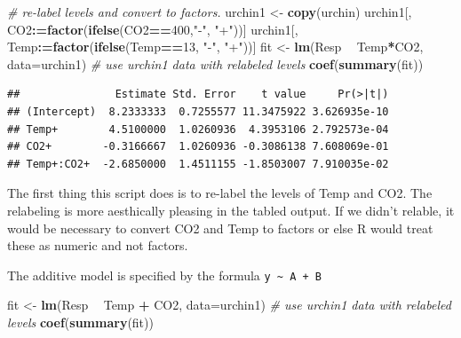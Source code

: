 \documentclass[]{book}
\newenvironment{Shaded}{\begin{snugshade}}{\end{snugshade}}
\newcommand{\KeywordTok}[1]{\textcolor[rgb]{0.13,0.29,0.53}{\textbf{#1}}}
\newcommand{\DataTypeTok}[1]{\textcolor[rgb]{0.13,0.29,0.53}{#1}}
\newcommand{\DecValTok}[1]{\textcolor[rgb]{0.00,0.00,0.81}{#1}}
\newcommand{\StringTok}[1]{\textcolor[rgb]{0.31,0.60,0.02}{#1}}
\newcommand{\CommentTok}[1]{\textcolor[rgb]{0.56,0.35,0.01}{\textit{#1}}}
\newcommand{\OperatorTok}[1]{\textcolor[rgb]{0.81,0.36,0.00}{\textbf{#1}}}
\newcommand{\ErrorTok}[1]{\textcolor[rgb]{0.64,0.00,0.00}{\textbf{#1}}}
\newcommand{\NormalTok}[1]{#1}
\begin{document}
\begin{Shaded}
\begin{Highlighting}[]
\CommentTok{# re-label levels and convert to factors.}
\NormalTok{urchin1 <-}\StringTok{ }\KeywordTok{copy}\NormalTok{(urchin)}
\NormalTok{urchin1[, CO2}\OperatorTok{:}\ErrorTok{=}\KeywordTok{factor}\NormalTok{(}\KeywordTok{ifelse}\NormalTok{(CO2}\OperatorTok{==}\DecValTok{400}\NormalTok{,}\StringTok{"-"}\NormalTok{, }\StringTok{"+"}\NormalTok{))]}
\NormalTok{urchin1[, Temp}\OperatorTok{:}\ErrorTok{=}\KeywordTok{factor}\NormalTok{(}\KeywordTok{ifelse}\NormalTok{(Temp}\OperatorTok{==}\DecValTok{13}\NormalTok{, }\StringTok{"-"}\NormalTok{, }\StringTok{"+"}\NormalTok{))]}
\NormalTok{fit <-}\StringTok{ }\KeywordTok{lm}\NormalTok{(Resp }\OperatorTok{~}\StringTok{ }\NormalTok{Temp}\OperatorTok{*}\NormalTok{CO2, }\DataTypeTok{data=}\NormalTok{urchin1) }\CommentTok{# use urchin1 data with relabeled levels}
\KeywordTok{coef}\NormalTok{(}\KeywordTok{summary}\NormalTok{(fit))}
\end{Highlighting}
\end{Shaded}

\begin{verbatim}
##               Estimate Std. Error    t value     Pr(>|t|)
## (Intercept)  8.2333333  0.7255577 11.3475922 3.626935e-10
## Temp+        4.5100000  1.0260936  4.3953106 2.792573e-04
## CO2+        -0.3166667  1.0260936 -0.3086138 7.608069e-01
## Temp+:CO2+  -2.6850000  1.4511155 -1.8503007 7.910035e-02
\end{verbatim}

The first thing this script does is to re-label the levels of Temp and
CO2. The relabeling is more aesthically pleasing in the tabled output.
If we didn't relable, it would be necessary to convert CO2 and Temp to
factors or else R would treat these as numeric and not factors.

The additive model is specified by the formula
\texttt{y\ \textasciitilde{}\ A\ +\ B}

\begin{Shaded}
\begin{Highlighting}[]
\NormalTok{fit <-}\StringTok{ }\KeywordTok{lm}\NormalTok{(Resp }\OperatorTok{~}\StringTok{ }\NormalTok{Temp }\OperatorTok{+}\StringTok{ }\NormalTok{CO2, }\DataTypeTok{data=}\NormalTok{urchin1) }\CommentTok{# use urchin1 data with relabeled levels}
\KeywordTok{coef}\NormalTok{(}\KeywordTok{summary}\NormalTok{(fit))}
\end{Highlighting}
\end{Shaded}
\end{document}

